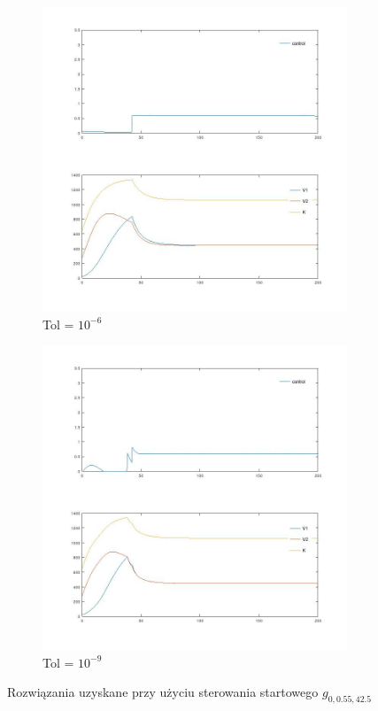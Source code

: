 \documentclass[licencjacka]{pracamgr}
\begin{document}
\begin{figure}[h!]
  \begin{subfigure}{.5\textwidth}
    \includegraphics[width=\textwidth]{../plots/p_55_6}
    \caption{Tol = $10^{-6}$}\label{p_55_6}
  \end{subfigure}
  \begin{subfigure}{.5\textwidth}
    \includegraphics[width=\textwidth]{../plots/p_55_9}
    \caption{Tol = $10^{-9}$}\label{p_55_9}
  \end{subfigure}%
  \caption{Rozwiązania uzyskane przy użyciu sterowania startowego $g_{0,0.55,42.5}$}\label{test_g55_sol}
\end{figure}
\end{document}
